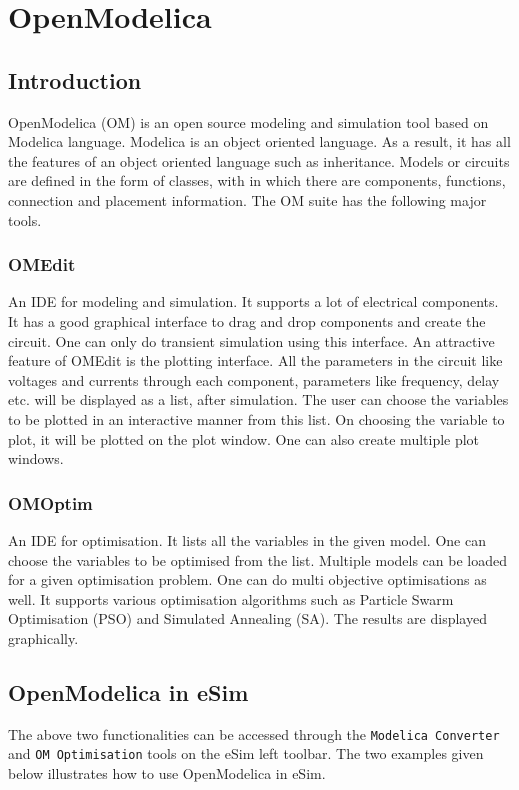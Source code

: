 \chapter{OpenModelica}
\thispagestyle{empty}
\label{chap12}

\section {Introduction}
OpenModelica (OM) is an open source modeling and simulation tool based on
Modelica language. Modelica is an object oriented language. As a result, it has all the
features of an object oriented language such as inheritance. Models or circuits are
defined in the form of classes, with in which there are components, functions,
connection and placement information. The OM suite has the following major tools.

\subsection {OMEdit}
An IDE for modeling and simulation. It supports a lot of electrical components. It
has a good graphical interface to drag and drop components and create the circuit.
One can only do transient simulation using this interface. An attractive feature of
OMEdit is the plotting interface. All the parameters in the circuit like voltages and currents through each component,
parameters like frequency, delay etc. will be displayed as
a list, after simulation. The user can choose the variables to be plotted in an
interactive manner from this list. On choosing the variable to plot, it will be plotted
on the plot window. One can also create multiple plot windows.

\subsection {OMOptim}
An IDE for optimisation. It lists all the variables in the given model. One can choose
the variables to be optimised from the list. Multiple models can be loaded for a given
optimisation problem. One can do multi objective optimisations as well. It supports
various optimisation algorithms such as Particle Swarm Optimisation (PSO) and
Simulated Annealing (SA). The results are displayed graphically.

\section {OpenModelica in eSim}
The above two functionalities can be accessed through the {\tt Modelica Converter} and {\tt OM Optimisation} tools on the eSim left toolbar. The two examples given below illustrates how to use OpenModelica in eSim. 

